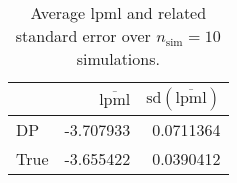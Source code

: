 \begin{table}[H]

\caption{Average lpml and related standard error over $n_{\text{sim}} = 10$ simulations.}
\centering
\begin{tabular}[t]{lrr}
\toprule
  & $\overbar{\text{lpml}}$ & $\text{sd}(\overbar{\text{lpml}})$\\
\midrule
DP & -3.707933 & 0.0711364\\
True & -3.655422 & 0.0390412\\
\bottomrule
\end{tabular}
\end{table}